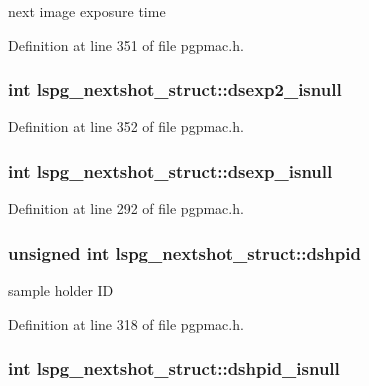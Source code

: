 next image exposure time 



Definition at line 351 of file pgpmac.\-h.

\hypertarget{structlspg__nextshot__struct_a45091283dc073e5b7da2cfbe5a75fade}{
\subsubsection[{dsexp2\-\_\-isnull}]{\setlength{\rightskip}{0pt plus 5cm}int lspg\-\_\-nextshot\-\_\-struct\-::dsexp2\-\_\-isnull}}\label{structlspg__nextshot__struct_a45091283dc073e5b7da2cfbe5a75fade}


Definition at line 352 of file pgpmac.\-h.

\hypertarget{structlspg__nextshot__struct_ae07498f62ea9c0e2f702b78c87500794}{
\subsubsection[{dsexp\-\_\-isnull}]{\setlength{\rightskip}{0pt plus 5cm}int lspg\-\_\-nextshot\-\_\-struct\-::dsexp\-\_\-isnull}}\label{structlspg__nextshot__struct_ae07498f62ea9c0e2f702b78c87500794}


Definition at line 292 of file pgpmac.\-h.

\hypertarget{structlspg__nextshot__struct_a5e260a420176f2973cdb100d0a5c4c09}{
\subsubsection[{dshpid}]{\setlength{\rightskip}{0pt plus 5cm}unsigned int lspg\-\_\-nextshot\-\_\-struct\-::dshpid}}\label{structlspg__nextshot__struct_a5e260a420176f2973cdb100d0a5c4c09}


sample holder I\-D 



Definition at line 318 of file pgpmac.\-h.

\hypertarget{structlspg__nextshot__struct_afe16be0382423aa3f25cb3d6cf99430b}{
\subsubsection[{dshpid\-\_\-isnull}]{\setlength{\rightskip}{0pt plus 5cm}int lspg\-\_\-nextshot\-\_\-struct\-::dshpid\-\_\-isnull}}\label{structlspg__nextshot__struct_afe16be0382423aa3f25cb3d6cf99430b}


